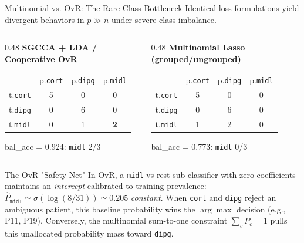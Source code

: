 \documentclass[aspectratio=169, 10pt]{beamer}
\begin{document}
\begin{frame}{Multinomial vs. OvR: The Rare Class Bottleneck}
  \vspace{15pt}
  Identical loss formulations yield divergent behaviors in $p \gg n$ under severe class imbalance.

  \medskip
  \begin{columns}[c]
    \begin{column}{0.48\textwidth}
      \centering
      \textbf{SGCCA + LDA / Cooperative OvR}
      \vskip 2pt
      \small
      \setlength{\tabcolsep}{7pt}
      \begin{tabular}{lccc}
                        & p.\texttt{cort}          & p.\texttt{dipg}          & p.\texttt{midl}                 \\
        t.\texttt{cort} & \cellcolor{lightgeblue}5 & 0                        & 0                               \\
        t.\texttt{dipg} & 0                        & \cellcolor{lightgeblue}6 & 0                               \\
        t.\texttt{midl} & 0                        & 1                        & \cellcolor{cellgreen}\textbf{2} \\
      \end{tabular}
      \vskip 2pt
      bal\_acc = 0.924: \texttt{midl} 2/3
    \end{column}

    \begin{column}{0.48\textwidth}
      \centering
      \textbf{Multinomial Lasso (grouped/ungrouped)}
      \vskip 2pt
      \small
      \setlength{\tabcolsep}{7pt}
      \begin{tabular}{lccc}
                        & p.\texttt{cort}          & p.\texttt{dipg}          & p.\texttt{midl}           \\
        t.\texttt{cort} & \cellcolor{lightgeblue}5 & 0                        & 0                         \\
        t.\texttt{dipg} & 0                        & \cellcolor{lightgeblue}6 & 0                         \\
        t.\texttt{midl} & 1                        & \cellcolor{cellred}2     & \cellcolor{celllightred}0 \\
      \end{tabular}
      \vskip 2pt
      bal\_acc = 0.773: \texttt{midl} 0/3
    \end{column}
  \end{columns}

  \medskip
  \begin{exampleblock}{The OvR "Safety Net"}
    In OvR, a \texttt{midl}-vs-rest sub-classifier with zero coefficients maintains an \textit{intercept} calibrated to training prevalence:
    $\hat{P}_{\texttt{midl}} \simeq \sigma(\log(8/31)) \simeq 0.205$ \textit{constant}.
    When \texttt{cort} and \texttt{dipg} reject an ambiguous patient, this baseline probability wins the $\arg\max$ decision (e.g., P11, P19). Conversely, the multinomial sum-to-one constraint $\sum_c P_c = 1$ pulls this unallocated probability mass toward \texttt{dipg}.
  \end{exampleblock}
\end{frame}
\end{document}
